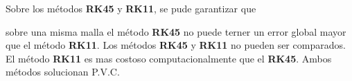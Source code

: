 \begin{pregunta}
\begin{cuerpo}
Sobre los m\'etodos \textbf{RK45} y \textbf{RK11}, se pude garantizar que
\end{cuerpo}
\begin{alternativas}
{sobre una misma malla el m\'etodo \textbf{RK45} no puede terner un error global mayor que el m\'etodo \textbf{RK11}.}
{Los m\'etodos \textbf{RK45} y \textbf{RK11} no pueden ser comparados.}
{El m\'etodo \textbf{RK11} es mas costoso computacionalmente que el \textbf{RK45}.}
{Ambos m\'etodos solucionan P.V.C.}
\end{alternativas}
\justificacion{0cm}
\end{pregunta}
